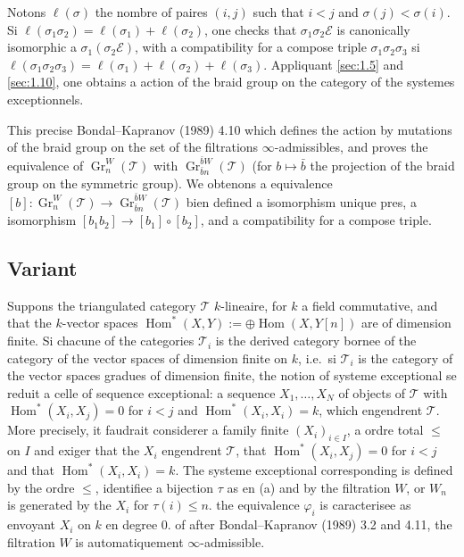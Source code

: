 \documentclass[11pt,a4paper]{article}
\theoremstyle{plain}
\theoremstyle{definition}
\DeclareMathOperator{\Hom}{Hom}
\DeclareMathOperator{\Gr}{Gr}
\newcommand{\cT}{\mathscr{T}}
\newcommand{\cE}{\mathscr{E}}
\begin{document}
Notons $\ell(\sigma)$ the nombre of paires $(i,j)$ such that $i < j$ and $\sigma(j) < \sigma(i)$. Si $\ell(\sigma_1 \sigma_2) = \ell(\sigma_1) + \ell(\sigma_2)$, one checks that $\sigma_1 \sigma_2 \cE$ is canonically isomorphic a $\sigma_1(\sigma_2 \cE)$, with a compatibility for a compose triple $\sigma_1 \sigma_2 \sigma_3$ si $\ell(\sigma_1 \sigma_2 \sigma_3) = \ell(\sigma_1) + \ell(\sigma_2) + \ell(\sigma_3)$. Appliquant \ref{sec:1.5} and \ref{sec:1.10}, one obtains a action of the braid group on the category of the systemes exceptionnels.

This precise Bondal--Kapranov (1989) 4.10 which defines the action by mutations of the braid group on the set of the filtrations $\infty$-admissibles, and proves the equivalence of $\Gr_n^W(\cT)$ with $\Gr_{\bar{b}n}^{\bar{b}W}(\cT)$ (for $b \mapsto \bar{b}$ the projection of the braid group on the symmetric group). We obtenons a equivalence $[b] : \Gr_n^W(\cT) \to \Gr_{\bar{b}n}^{\bar{b}W}(\cT)$ bien defined a isomorphism unique pres, a isomorphism $[b_1 b_2] \to [b_1] \circ [b_2]$, and a compatibility for a compose triple.

\subsection*{Variant}

Suppons the triangulated category $\cT$ $k$-lineaire, for $k$ a field commutative, and that the $k$-vector spaces $\Hom^*(X,Y) := \oplus \Hom(X, Y[n])$ are of dimension finite. Si chacune of the categories $\cT_i$ is the derived category bornee of the category of the vector spaces of dimension finite on $k$, i.e.\ si $\cT_i$ is the category of the vector spaces gradues of dimension finite, the notion of systeme exceptional se reduit a celle of sequence exceptional: a sequence $X_1,\ldots,X_N$ of objects of $\cT$ with $\Hom^*(X_i, X_j) = 0$ for $i < j$ and $\Hom^*(X_i, X_i) = k$, which engendrent $\cT$. More precisely, it faudrait considerer a family finite $(X_i)_{i \in I}$, a ordre total $\leq$ on $I$ and exiger that the $X_i$ engendrent $\cT$, that $\Hom^*(X_i, X_j) = 0$ for $i < j$ and that $\Hom^*(X_i, X_i) = k$. The systeme exceptional corresponding is defined by the ordre $\leq$, identifiee a bijection $\tau$ as en (a) and by the filtration $W$, or $W_n$ is generated by the $X_i$ for $\tau(i) \leq n$. the equivalence $\varphi_i$ is caracterisee as envoyant $X_i$ on $k$ en degree $0$. of after Bondal--Kapranov (1989) 3.2 and 4.11, the filtration $W$ is automatiquement $\infty$-admissible.
\end{document}
